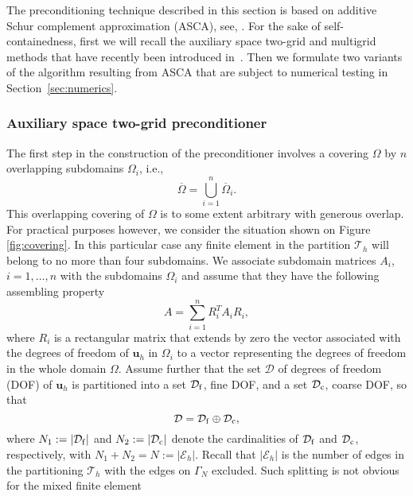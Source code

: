 \documentclass[11pt]{amsart}
\numberwithin{equation}{section}
\theoremstyle{definition}\newtheorem{example}{Example}[section]
\begin{document}
The preconditioning technique described in this section is based on additive Schur complement
approximation (ASCA), see, \cite{Kraus_12}. For the sake of self-containedness, first we will
recall the auxiliary space two-grid and multigrid methods that have recently been introduced
in~\cite{Kraus_Lymb_Mar_2014}. Then we formulate two variants of the algorithm 
resulting from ASCA that are subject to
numerical testing in Section~\ref{sec:numerics}.

\subsubsection{Auxiliary space two-grid preconditioner}\label{sec:as-2-grid-precond}

The first step in the construction of the preconditioner involves a covering
$\Omega$ by $n$  overlapping subdomains $\Omega_{i}$, i.e.,  
\begin{equation*}
 \overline{\Omega}=\bigcup_{i=1}^{n} \overline{\Omega}_{i}.
\end{equation*}
This overlapping covering of $\Omega$ is to some
extent
arbitrary with generous overlap.
For practical purposes however, we consider the situation shown on Figure \ref{fig:covering}.
In this particular case any finite element in the partition $\mathcal{T}_h$
will belong to no more than four subdomains.
We associate subdomain matrices $A_{i}$,
$i=1,\dots,n$ with the subdomains $\Omega_{i}$ and assume that
they have the following assembling property
$$
A=\sum_{i=1}^{n} R_{{i}}^T A_{{i}} R_{{i}},
$$
where $ R_{i}$ is a rectangular matrix that extends by zero the vector associated with the
degrees of freedom of ${{\mathbf u}}_h$ in $\Omega_i$ to a vector representing the degrees of 
freedom in the whole domain $\Omega$.
Assume further that the set $\mathcal{D}$ of degrees of freedom (DOF) of ${{\mathbf u}}_h$ 
is partitioned into a set $\mathcal{D}_{\rm f}$, fine DOF, and a set
$\mathcal{D}_{\rm c}$, coarse DOF, so that
\begin{equation}\label{eq:partitioning_DOF}
\mathcal{D} = \mathcal{D}_{\rm f} \oplus \mathcal{D}_{\rm c},
\end{equation}
where $N_1:=\vert\mathcal{D}_{\rm f} \vert$ and $N_2:=\vert\mathcal{D}_{\rm c} \vert$
denote the cardinalities of $\mathcal{D}_{\rm f}$ and $\mathcal{D}_{\rm c}$, respectively,
with $N_1 + N_2 =N:=|{\mathcal E}_h|$. Recall that  $ |{\mathcal E}_h|$ 
is the number of edges in the partitioning ${\mathcal T}_h$ with the 
edges on $\Gamma_N$ excluded.
Such splitting is not obvious for the mixed finite element 
\end{document}
